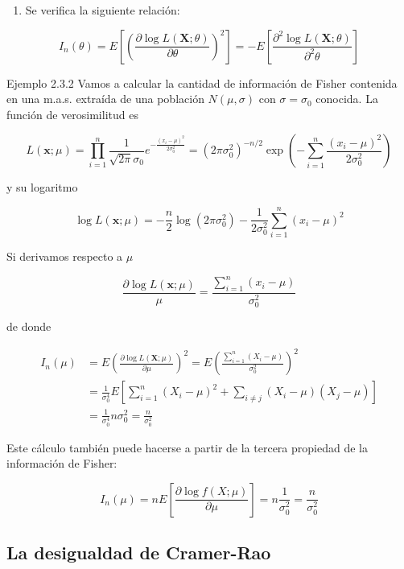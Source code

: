 \documentclass[
]{article}
\providecommand{\tightlist}{%
  \setlength{\itemsep}{0pt}\setlength{\parskip}{0pt}}
\begin{document}
\begin{enumerate}
\def\labelenumi{\arabic{enumi}.}
\setcounter{enumi}{3}
\tightlist
\item
  Se verifica la siguiente relación:
\end{enumerate}

\[
I_{n}(\theta)=E\left[\left(\frac{\partial \log L(\mathbf{X} ; \theta)}{\partial \theta}\right)^{2}\right]=-E\left[\frac{\partial^{2} \log L(\mathbf{X} ; \theta)}{\partial^{2} \theta}\right]
\]

Ejemplo 2.3.2 Vamos a calcular la cantidad de información de Fisher contenida en una m.a.s. extraída de una población \(N(\mu, \sigma)\) con \(\sigma=\sigma_{0}\) conocida. La función de verosimilitud es

\[
L(\mathbf{x} ; \mu)=\prod_{i=1}^{n} \frac{1}{\sqrt{2 \pi} \sigma_{0}} e^{-\frac{\left(x_{i}-\mu\right)^{2}}{2 \sigma_{0}^{2}}}=\left(2 \pi \sigma_{0}^{2}\right)^{-n / 2} \exp \left(-\sum_{i=1}^{n} \frac{\left(x_{i}-\mu\right)^{2}}{2 \sigma_{0}^{2}}\right)
\]

y su logaritmo

\[
\log L(\mathbf{x} ; \mu)=-\frac{n}{2} \log \left(2 \pi \sigma_{0}^{2}\right)-\frac{1}{2 \sigma_{0}^{2}} \sum_{i=1}^{n}\left(x_{i}-\mu\right)^{2}
\]

Si derivamos respecto a \(\mu\)

\[
\frac{\partial \log L(\mathbf{x} ; \mu)}{\mu}=\frac{\sum_{i=1}^{n}\left(x_{i}-\mu\right)}{\sigma_{0}^{2}}
\]

de donde

\[
\begin{aligned}
I_{n}(\mu) & =E\left(\frac{\partial \log L(\mathbf{X} ; \mu)}{\partial \mu}\right)^{2}=E\left(\frac{\sum_{i=1}^{n}\left(X_{i}-\mu\right)}{\sigma_{0}^{2}}\right)^{2} \\
& =\frac{1}{\sigma_{0}^{4}} E\left[\sum_{i=1}^{n}\left(X_{i}-\mu\right)^{2}+\sum_{i \neq j}\left(X_{i}-\mu\right)\left(X_{j}-\mu\right)\right] \\
& =\frac{1}{\sigma_{0}^{4}} n \sigma_{0}^{2}=\frac{n}{\sigma_{0}^{2}}
\end{aligned}
\]

Este cálculo también puede hacerse a partir de la tercera propiedad de la información de Fisher:

\[
I_{n}(\mu)=n E\left[\frac{\partial \log f(X ; \mu)}{\partial \mu}\right]=n \frac{1}{\sigma_{0}^{2}}=\frac{n}{\sigma_{0}^{2}}
\]

\subsection{La desigualdad de Cramer-Rao}\label{la-desigualdad-de-cramer-rao}
\end{document}
